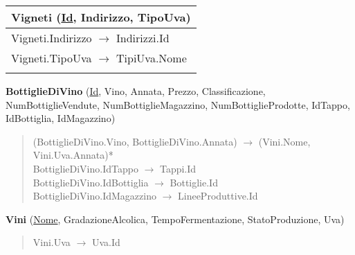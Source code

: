 \begin{center}
\begin{minipage}{7.5cm}
{\begin{tabular}{P{7.5cm}}
				 \textbf{Vigneti} (\underline{Id}, Indirizzo, TipoUva)                                                                                                                                 \\
				\midrule
				Vigneti.Indirizzo $\to$ Indirizzi.Id                                                                                                                                                                                   \\
				\midrule
				Vigneti.TipoUva $\to$ TipiUva.Nome                                                                                                                                                                                     \\                                \\
				\bottomrule
			\end{tabular}
		}
	\end{minipage}
	\hspace{5mm}
	\begin{minipage}{7.5cm}
	\end{minipage}
\end{center}


\textbf{BottiglieDiVino} (\underline{Id}, Vino, Annata, Prezzo, Classificazione, NumBottiglieVendute, NumBottiglieMagazzino, NumBottiglieProdotte, IdTappo, IdBottiglia, IdMagazzino)
\begin{verse}
	(BottiglieDiVino.Vino, BottiglieDiVino.Annata) $\to$ (Vini.Nome, Vini.Uva.Annata)*\\
	BottiglieDiVino.IdTappo $\to$ Tappi.Id\\
	BottiglieDiVino.IdBottiglia $\to$ Bottiglie.Id\\
	BottiglieDiVino.IdMagazzino $\to$ LineeProduttive.Id
\end{verse}

\textbf{Vini} (\underline{Nome}, GradazioneAlcolica, TempoFermentazione, StatoProduzione, Uva)
\begin{verse}
	Vini.Uva $\to$ Uva.Id
\end{verse}

